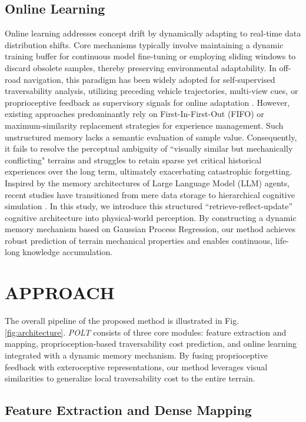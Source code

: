 \documentclass[letterpaper, 10 pt, conference]{ieeeconf}  %
\begin{document}
\subsection{Online Learning}

Online learning addresses concept drift by dynamically adapting to real-time data distribution shifts. Core mechanisms typically involve maintaining a dynamic training buffer for continuous model fine-tuning or employing sliding windows to discard obsolete samples, thereby preserving environmental adaptability. In off-road navigation, this paradigm has been widely adopted for self-supervised traversability analysis, utilizing preceding vehicle trajectories, multi-view cues, or proprioceptive feedback as supervisory signals for online adaptation \cite{c10, c33, c34, c35, c36, c37}. However, existing approaches predominantly rely on First-In-First-Out (FIFO) or maximum-similarity replacement strategies for experience management. Such unstructured memory lacks a semantic evaluation of sample value. Consequently, it fails to resolve the perceptual ambiguity of ``visually similar but mechanically conflicting" terrains and struggles to retain sparse yet critical historical experiences over the long term, ultimately exacerbating catastrophic forgetting. Inspired by the memory architectures of Large Language Model (LLM) agents, recent studies have transitioned from mere data storage to hierarchical cognitive simulation \cite{c38, c39, c40}. In this study, we introduce this structured ``retrieve-reflect-update'' cognitive architecture into physical-world perception. By constructing a dynamic memory mechanism based on Gaussian Process Regression, our method achieves robust prediction of terrain mechanical properties and enables continuous, life-long knowledge accumulation.


\section{APPROACH}

The overall pipeline of the proposed method is illustrated in Fig. \ref{fig:architecture}. \textit{POLT} consists of three core modules: feature extraction and mapping, proprioception-based traversability cost prediction, and online learning integrated with a dynamic memory mechanism. By fusing proprioceptive feedback with exteroceptive representations, our method leverages visual similarities to generalize local traversability cost to the entire terrain.

\subsection{Feature Extraction and Dense Mapping}
\end{document}
